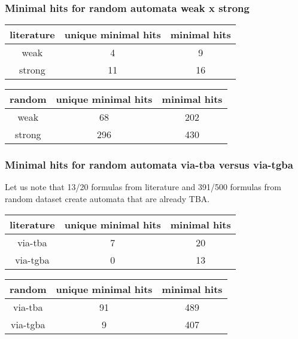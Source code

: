 \documentclass[
	digital
nolof, nolot
]{fithesis3}
\begin{document}
		\subsubsection{Minimal hits for random automata weak x strong}
		\begin{center}
			\begin{tabular}{ |c|c|c| } 
				\hline
				literature&unique minimal hits&minimal hits\\
				\hline
				weak&4 & 9\\
				\hline
				strong&11 & 16\\ 
				\hline
			\end{tabular}
		\end{center}
	\begin{center}
		\begin{tabular}{ |c|c|c| } 
			\hline
			random&unique minimal hits&minimal hits\\
			\hline
			weak&68 & 202\\
			\hline
			strong&296 & 430\\ 
			\hline
		\end{tabular}
	\end{center}
		\subsubsection{Minimal hits for random automata via-tba versus via-tgba}
		Let us note that 13/20 formulas from literature and 391/500 formulas from random dataset create automata that are already TBA. 
		\begin{center}
			\begin{tabular}{ |c|c|c| } 
				\hline
				literature&unique minimal hits&minimal hits\\
				\hline
				via-tba&7 & 20\\
				\hline
				via-tgba&0 & 13\\ 
				\hline
			\end{tabular}
		\end{center}
				\begin{center}
			\begin{tabular}{ |c|c|c| } 
				\hline
				random&unique minimal hits&minimal hits\\
				\hline
				via-tba&91 & 489\\
				\hline
				via-tgba&9 & 407\\ 
				\hline
			\end{tabular}
		\end{center}
	
\end{document}
